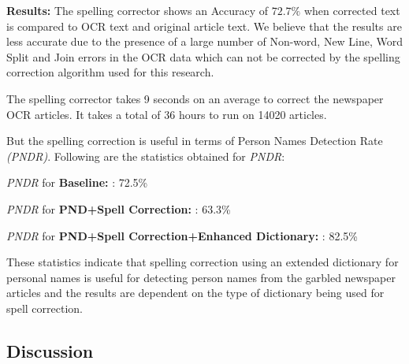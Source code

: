 \documentclass[letterpaper,11pt]{report}
\begin{document}
\noindent \textbf{Results: }
The spelling corrector shows an Accuracy of $72.7 \%$  when corrected text is compared to OCR text and original article text. We believe that the results are less accurate due to the presence of a large number of Non-word, New Line, Word Split and Join errors in the OCR data which can not be corrected by the spelling correction algorithm used for this research.

The spelling corrector takes 9 seconds on an average to correct the newspaper OCR articles. It takes a total of 36 hours to run on 14020 articles.


But the spelling correction is useful in terms of Person Names Detection Rate \textit{(PNDR)}. Following are the statistics obtained for \textit{PNDR}:

\textit{PNDR} for \textbf{Baseline: }: 72.5\% 

\textit{PNDR} for \textbf{PND+Spell Correction: }: 63.3\% 

\textit{PNDR} for \textbf{PND+Spell Correction+Enhanced Dictionary: }: 82.5\% 

These statistics indicate that spelling correction using an extended dictionary for personal names is useful for detecting person names from the garbled newspaper articles and the results are dependent on the type of dictionary being used for spell correction.
 

\subsection{Discussion}
\label{spell:discussion}
\end{document}

